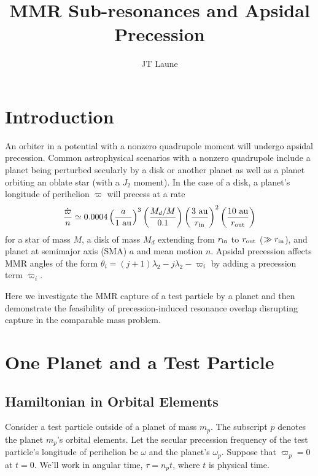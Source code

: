\documentclass{article}
\title{MMR Sub-resonances and Apsidal Precession}
\author{JT Laune}
\begin{document}
\maketitle

\section{Introduction}
An orbiter in a potential with a nonzero quadrupole moment will undergo apsidal precession. 
Common astrophysical scenarios with a nonzero quadrupole include a planet being perturbed secularly by a disk or another planet as well as a planet orbiting an oblate star (with a $J_2$ moment). 
In the case of a disk, a planet's longitude of perihelion $\varpi$ will precess at a rate
\begin{equation}\label{eq:diskprecscaling}
    \frac{\dot\varpi}{n} \simeq 0.0004\left(\frac{a}{1~\rm{au}}\right)^3\left(\frac{M_d/M}{0.1}\right)\left(\frac{3~\rm{au}}{r_{\rm in}}\right)^2\left(\frac{10~\rm{au}}{r_{\rm out}}\right)
\end{equation}
for a star of mass $M$, a disk of mass $M_d$ extending from $r_{\rm in}$ to $r_{\rm out}$ ($\gg r_{\rm in}$), and planet at semimajor axis (SMA) $a$ and mean motion $n$.
Apsidal precession affects MMR angles of the form $\theta_i=(j+1)\lambda_2-j\lambda_2-\varpi_i$ by adding a precession term $\dot\varpi_i$.

Here we investigate the MMR capture of a test particle by a planet and then demonstrate the feasibility of precession-induced resonance overlap disrupting capture in the comparable mass problem.

\section{One Planet and a Test Particle}\label{sec:tp}
\subsection{Hamiltonian in Orbital Elements}
Consider a test particle outside of a planet of mass $m_p$.
The subscript $p$ denotes the planet $m_p$'s orbital elements.
Let the secular precession frequency of the test particle's longitude of perihelion be $\omega$ and the planet's $\omega_p$.
Suppose that $\varpi_p=0$ at $t=0$.
We'll work in angular time, $\tau = n_pt$, where $t$ is physical time.
\end{document}

